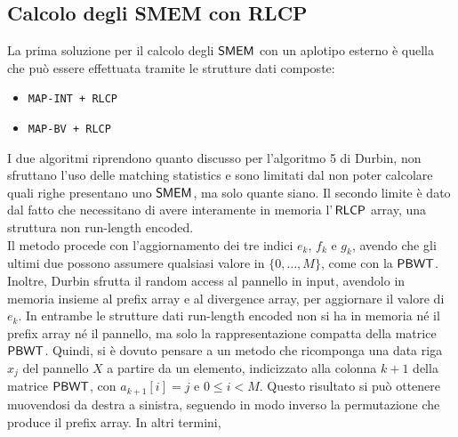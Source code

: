 \subsection{Calcolo degli SMEM con RLCP}
La prima soluzione per il calcolo degli $\mbox{\rm {\sf SMEM}}$ con un aplotipo esterno è
quella che può essere effettuata tramite le strutture dati composte:
\begin{itemize}
  \item \texttt{MAP-INT + RLCP}
  \item \texttt{MAP-BV + RLCP}
\end{itemize}
I due algoritmi riprendono quanto discusso per l'algoritmo 5
di Durbin, non sfruttano l'uso delle matching statistics e sono
limitati dal non 
poter calcolare quali righe presentano uno $\mbox{\rm {\sf SMEM}}$, ma solo quante
siano. Il secondo limite è dato dal fatto che necessitano di avere interamente
in memoria l'$\,\mbox{\rm {\sf RLCP}}$ array, una
struttura non run-length encoded.\\
Il metodo procede con l'aggiornamento dei tre indici $e_k$, $f_k$ e
$g_k$, avendo che gli ultimi due possono assumere qualsiasi valore in
$\{0,\ldots, M\}$, come con la $\mbox{\rm {\sf PBWT}}$.
Inoltre, Durbin sfrutta il random access al pannello in input, avendolo in
memoria insieme al prefix array e al divergence array, per aggiornare il
valore di $e_k$. In entrambe le strutture dati run-length encoded
non si ha in memoria né il prefix array né il pannello, ma solo la
rappresentazione compatta della matrice $\mbox{\rm {\sf PBWT}}$. Quindi, si è dovuto
pensare a un metodo che ricomponga una data riga $x_j$ del pannello $X$ a
partire da un elemento, indicizzato alla
colonna $k+1$ della matrice $\mbox{\rm {\sf PBWT}}$, con $a_{k+1}[i]=j$ e $0\leq i<M$.
Questo risultato si può ottenere muovendosi da destra a
sinistra, seguendo in modo 
inverso la permutazione che produce il prefix array. In altri termini,
